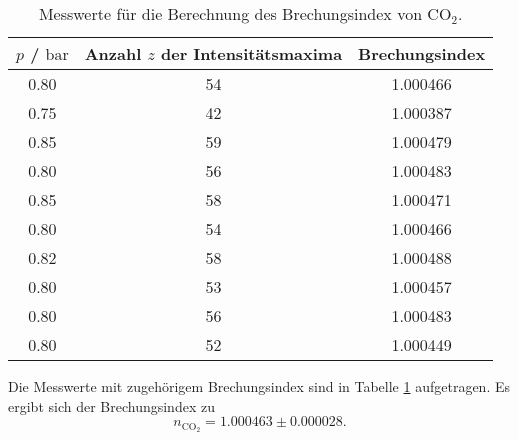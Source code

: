 \begin{table}
	\caption{Messwerte für die Berechnung des Brechungsindex von \texorpdfstring{CO$_2$}{math}.}
	\label{tab:co2brech}
	\centering
	\begin{tabular}{ccc}
	\toprule
	$p$ / $\si{\bar}$ & Anzahl $z$ der Intensitätsmaxima & Brechungsindex \\
	\midrule
		0.80 & 54 & 1.000466 \\
		0.75 & 42 & 1.000387 \\
		0.85 & 59 & 1.000479 \\
		0.80 & 56 & 1.000483 \\
		0.85 & 58 & 1.000471 \\
		0.80 & 54 & 1.000466 \\
		0.82 & 58 & 1.000488 \\
		0.80 & 53 & 1.000457 \\
		0.80 & 56 & 1.000483 \\
		0.80 & 52 & 1.000449 \\
	\bottomrule
	\end{tabular}
\end{table}

Die Messwerte mit zugehörigem Brechungsindex sind in Tabelle \ref{tab:co2brech} aufgetragen.
Es ergibt sich der Brechungsindex zu
\begin{equation}
	n_{\mathrm{CO}_2} = 1.000463 \pm 0.000028 \mathrm{.}
\end{equation}
